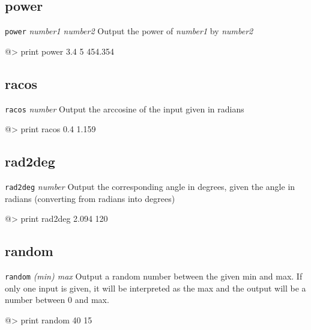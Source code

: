 \subsection*{power}  
 
{\tt power} {\it number1 number2} 
\newline\newline 
Output the power of {\it number1} by {\it number2}
\begin{verbatimtab} 
@> print power 3.4 5 
454.354
\end{verbatimtab} 
 
\subsection*{racos}  
 
{\tt racos} {\it number} 
\newline\newline 
Output the arccosine of the input given in radians 
\begin{verbatimtab} 
@> print racos 0.4 
1.159 
\end{verbatimtab}

\subsection*{rad2deg}  
 
{\tt rad2deg} {\it number} 
\newline\newline 
Output the corresponding angle in degrees, given the angle in radians  (converting from radians into degrees)
\begin{verbatimtab} 
@> print rad2deg 2.094
120
\end{verbatimtab}
 
\subsection*{random}  
 
{\tt random} {\it (min) max} 
\newline\newline 
Output a random number between the given min and max.  If only one input is given, it will be interpreted as the max and the output will be a number between 0 and max. 
\begin{verbatimtab} 
@> print random 40 
15 
\end{verbatimtab}
 
